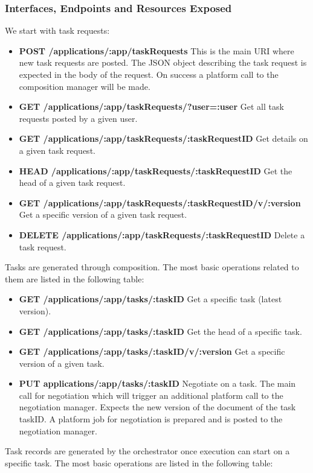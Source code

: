\subsubsection{Interfaces, Endpoints and Resources Exposed}
We start with task requests:
\begin{itemize}
\item {\bf POST /applications/:app/taskRequests} This is the main URI where new task requests are posted. The JSON object describing the task request is expected in the body of the request. On success a platform call to the composition manager will be made.
\item {\bf GET /applications/:app/taskRequests/?user=:user} Get all task requests posted by a given user.
\item {\bf GET /applications/:app/taskRequests/:taskRequestID} Get details on a given task request.
\item {\bf HEAD /applications/:app/taskRequests/:taskRequestID} Get the head of a given task request.
\item {\bf GET /applications/:app/taskRequests/:taskRequestID/v/:version} Get a specific version of a given task request.
\item {\bf DELETE /applications/:app/taskRequests/:taskRequestID} Delete a task request.
\end{itemize}
Tasks are generated through composition. The most basic operations related to them are listed in the following table:
\begin{itemize}
\item {\bf GET /applications/:app/tasks/:taskID} Get a specific task (latest version).
\item {\bf GET /applications/:app/tasks/:taskID} Get the head of a specific task.
\item {\bf GET /applications/:app/tasks/:taskID/v/:version} Get a specific version of a given task.
\item {\bf PUT applications/:app/tasks/:taskID} Negotiate on a task. The main call for negotiation which will trigger an additional platform call to the negotiation manager. Expects the new version of the document of the task taskID. A platform job for negotiation is prepared and is posted to the negotiation manager.
\end{itemize}
Task records are generated by the orchestrator once execution can start on a specific task. The most basic operations are listed in the following table:

